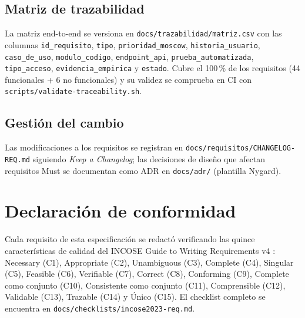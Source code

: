 \documentclass[12pt,a4paper]{article}
\begin{document}
\subsection{Matriz de trazabilidad}
\label{sec:matriz}

La matriz end-to-end se versiona en \texttt{docs/trazabilidad/matriz.csv} con las columnas
\texttt{id\_requisito}, \texttt{tipo}, \texttt{prioridad\_moscow},
\texttt{historia\_usuario}, \texttt{caso\_de\_uso}, \texttt{modulo\_codigo},
\texttt{endpoint\_api}, \texttt{prueba\_automatizada}, \texttt{tipo\_acceso},
\texttt{evidencia\_empirica} y \texttt{estado}. Cubre el 100\,\% de los requisitos
(44 funcionales + 6 no funcionales) y su validez se comprueba
en CI con \texttt{scripts/validate-traceability.sh}.

\subsection{Gestión del cambio}
\label{sec:gestion}

Las modificaciones a los requisitos se registran en \texttt{docs/requisitos/CHANGELOG-REQ.md}
siguiendo \textit{Keep a Changelog}; las decisiones de diseño que afectan requisitos Must se
documentan como ADR en \texttt{docs/adr/} (plantilla Nygard).

\section*{Declaración de conformidad}

Cada requisito de esta especificación se redactó verificando las quince características de
calidad del INCOSE Guide to Writing Requirements v4 \cite{incose}: Necessary (C1),
Appropriate (C2), Unambiguous (C3), Complete (C4), Singular (C5), Feasible (C6),
Verifiable (C7), Correct (C8), Conforming (C9), Complete como conjunto (C10),
Consistente como conjunto (C11), Comprensible (C12), Validable (C13), Trazable (C14) y
Único (C15). El checklist completo se encuentra en
\texttt{docs/checklists/incose2023-req.md}.

\newpage
\printbibliography[title={Referencias}]
\end{document}
